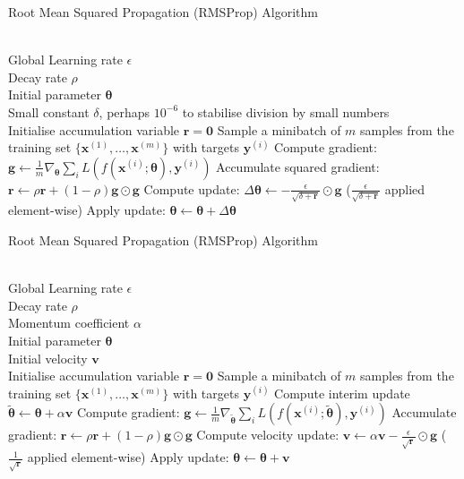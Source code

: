 \begin{breakablealgorithm}
\caption{Root Mean Squared Propagation (RMSProp) Algorithm}
\begin{algorithmic}
\Require \\
Global Learning rate $\epsilon$\\
Decay rate $\rho$\\
Initial parameter $\bm{\theta}$\\
Small constant $\delta$, perhaps $10^{-6}$ to stabilise division by small numbers\\

\State Initialise accumulation variable $\bm{r} = \bm{0}$
\State Sample a minibatch of $m$ samples from the training set $\{\bm{x}^{(1)}, \ldots, \bm{x}^{(m)} \}$ with targets $\bm{y}^{(i)}$
\State Compute gradient: $\bm{g} \leftarrow \frac{1}{m} \nabla_{\bm{\theta}} \sum_i L(f(\bm{x}^{(i)}; \bm{\theta}), \bm{y}^{(i)})$
\State Accumulate squared gradient: $\bm{r} \leftarrow \rho \bm{r} + (1 - \rho) \bm{g} \odot \bm{g}$
\State Compute update: $\Delta \bm{\theta} \leftarrow - \frac{\epsilon}{\sqrt{\delta + \bm{r}}} \odot \bm{g}$ ($\frac{\epsilon}{\sqrt{\delta + \bm{r}}}$ applied element-wise)
\State Apply update: $\bm{\theta} \leftarrow \bm{\theta} + \Delta \bm{\theta}$
\EndWhile
\end{algorithmic}
\end{breakablealgorithm}

\begin{breakablealgorithm}
\caption{Root Mean Squared Propagation (RMSProp) Algorithm}
\begin{algorithmic}
\Require \\
Global Learning rate $\epsilon$\\
Decay rate $\rho$\\
Momentum coefficient $\alpha$\\
Initial parameter $\bm{\theta}$\\
Initial velocity $\bm{v}$\\

\State Initialise accumulation variable $\bm{r} = \bm{0}$
\State Sample a minibatch of $m$ samples from the training set $\{\bm{x}^{(1)}, \ldots, \bm{x}^{(m)} \}$ with targets $\bm{y}^{(i)}$
\State Compute interim update $\tilde{\bm{\theta}} \leftarrow \bm{\theta} + \alpha \bm{v}$
\State Compute gradient: $\bm{g} \leftarrow \frac{1}{m} \nabla_{\tilde{\bm{\theta}}} \sum_i L(f(\bm{x}^{(i)}; \tilde{\bm{\theta}}), \bm{y}^{(i)})$
\State Accumulate gradient: $\bm{r} \leftarrow \rho \bm{r} + (1 - \rho) \bm{g} \odot \bm{g}$
\State Compute velocity update: $\bm{v} \leftarrow \alpha \bm{v} - \frac{\epsilon}{\sqrt{\bm{r}}} \odot \bm{g}$ ($\frac{1}{\sqrt{\bm{r}}}$ applied element-wise)
\State Apply update: $\bm{\theta} \leftarrow \bm{\theta} + \bm{v}$
\EndWhile
\end{algorithmic}
\end{breakablealgorithm}

